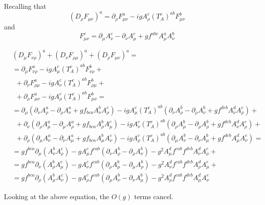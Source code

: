 \documentclass[twoside]{amsart}
\newcommand{\solutionhead}[1]
  {\smallskip
   \noindent{\large\bf Solution #1.}
   }
\begin{document}
\solutionhead{70.6} 

Recalling that 
\[
(D_{\rho} F_{\mu \nu})^a = \partial_{\rho} F_{\mu \nu}^a - ig A_{\rho}^c (T^c_A )^{ab} F_{\mu \nu}^b
\]
and
\[
F^c_{\mu \nu} = \partial_{\mu } A_{\nu}^c - \partial_{\nu} A_{\mu}^c + gf^{abc} A_{\mu}^a A_{\nu}^b
\]


\[
\begin{aligned}
  & (D_{\mu} F_{\nu \rho})^a +   (D_{\nu} F_{\rho \mu})^a +   (D_{\rho} F_{\mu \nu})^a = \\
    & = \partial_{\mu} F_{\nu \rho}^a - ig A_{\mu}^c (T^c_A)^{ab} F^b_{\nu \rho } +  \\
    & \phantom{ ,}  + \partial_{\nu} F_{\rho \mu}^a - ig A_{\nu}^c (T^c_A)^{ab} F^b_{\rho \mu } + \\
    & \phantom{ ,}  + \partial_{\rho} F_{\mu \nu}^a - ig A_{\rho}^c (T^c_A)^{ab} F^b_{\mu \nu } =     \\
    & = \partial_{\mu} ( \partial_{\nu} A_{\rho}^a - \partial_{\rho } A_{\nu}^a + gf_{bca} A_{\nu}^b A_{\rho}^c  ) - igA_{\mu}^c (T_A^c)^{ab} ( \partial_{\nu} A_{\rho}^b - \partial_{\rho } A_{\nu}^b + gf^{deb} A_{\nu}^d A_{\rho}^e ) + \\
    & \phantom{,} +  \partial_{\nu} ( \partial_{\rho} A_{\mu}^a - \partial_{\mu } A_{\rho}^a + gf_{bca} A_{\rho}^b A_{\mu}^c  ) - igA_{\nu}^c (T_A^c)^{ab} ( \partial_{\rho} A_{\mu}^b - \partial_{\rho } A_{\rho}^b + gf^{deb} A_{\nu}^d A_{\rho}^e ) + \\
    & \phantom{,} +  \partial_{\rho} ( \partial_{\mu} A_{\nu}^a - \partial_{\nu } A_{\mu}^a + gf_{bca} A_{\mu}^b A_{\nu}^c  ) - igA_{\rho}^c (T_A^c)^{ab} ( \partial_{\mu} A_{\nu}^b - \partial_{\nu } A_{\mu}^b + gf^{deb} A_{\mu}^d A_{\nu}^e ) = \\
  & = gf^{bca} \partial_{\mu} ( A^b_{\nu} A^c_{\rho} ) - gA_{\mu}^c f^{cab} (\partial_{\nu} A_{\rho}^b - \partial_{\rho} A_{\nu}^b ) - g^2 A_{\mu}^d f^{cab} f^{deb} A_{\nu}^d A_{\rho}^e  + \\ 
  & = gf^{bca} \partial_{\nu} ( A^b_{\rho} A^c_{\mu} ) - gA_{\nu}^c f^{cab} (\partial_{\rho} A_{\mu}^b - \partial_{\mu} A_{\rho}^b ) - g^2 A_{\nu}^d f^{cab} f^{deb} A_{\rho}^d A_{\mu}^e  + \\ 
  & = gf^{bca} \partial_{\rho} ( A^b_{\mu} A^c_{\nu} ) - gA_{\rho}^c f^{cab} (\partial_{\mu} A_{\nu}^b - \partial_{\nu} A_{\mu}^b ) - g^2 A_{\rho}^d f^{cab} f^{deb} A_{\mu}^d A_{\nu}^e  
\end{aligned}
\]

Looking at the above equation, the $O(g)$ terms cancel.  
\end{document}

